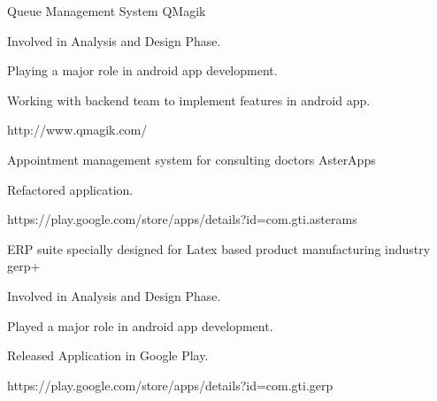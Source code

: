 

\begin{cventries}

\cventry
    {Queue Management System} %
    {QMagik} %
    {} %
    {} %
    {
      \begin{cvitems} %
        \item {Involved in Analysis and Design Phase.}
        \item {Playing a major role in android app development.}
        \item {Working with backend team to implement features in android app.}
        \item{http://www.qmagik.com/}
      \end{cvitems}
    }


\cventry
    {Appointment management system for consulting doctors} %
    {AsterApps} %
    {} %
    {} %
    {
      \begin{cvitems} %
        \item {Refactored application.}
        \item{https://play.google.com/store/apps/details?id=com.gti.asterams}
      \end{cvitems}
    }

\cventry
    {ERP suite specially designed for Latex based product manufacturing industry} %
    {gerp+ } %
    {} %
    {} %
    {
      \begin{cvitems} %
        \item {Involved in Analysis and Design Phase.}
        \item {Played a major role in android app development.}
        \item {Released Application in Google Play.}
        \item{https://play.google.com/store/apps/details?id=com.gti.gerp}
      \end{cvitems}
    }


\end{cventries}
